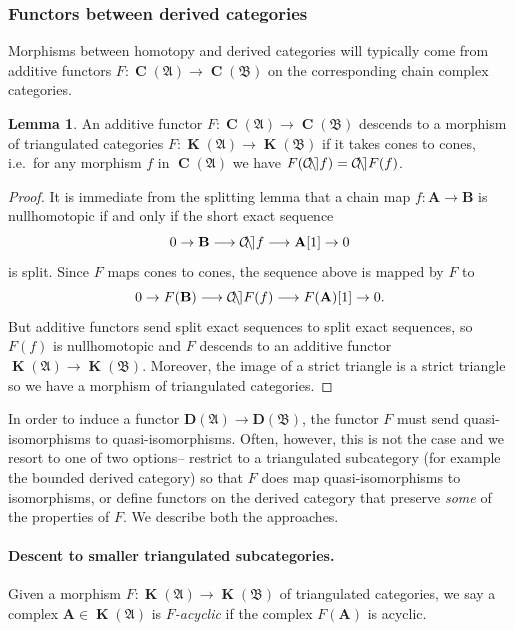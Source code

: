 \documentclass[a4paper]{article}
\theoremstyle{definition}
\newtheorem{lemma}[defn]{Lemma}
\theoremstyle{remark}
\DeclareMathOperator{\cone}{\mathcal{C\kern -2pt o \kern -2pt n \kern -2pt e
\kern -2pt}}
\DeclareMathOperator{\Ch}{\mathbf{C}}
\DeclareMathOperator{\kom}{{\mathbf{K}}}
\newcommand{\deri}{\mathbf{D}}
\begin{document}
\subsubsection{Functors between derived categories}
Morphisms between homotopy and derived categories will typically come from
additive functors \(F:\Ch(\mathfrak{A})\rightarrow \Ch(\mathfrak{B})\) on the
corresponding chain complex categories.

\begin{lemma}\label{descent-to-homotopy}
    An additive functor \(F:\Ch(\mathfrak{A})\rightarrow \Ch(\mathfrak{B})\)
    descends to a morphism of triangulated categories
    \(F:\kom(\mathfrak{A})\rightarrow \kom(\mathfrak{B})\) if
    it takes cones to cones, i.e.\ for any morphism \(f\) in
    \(\Ch(\mathfrak{A})\) we have \({F(\cone f) = \cone F(f)}\).
    \begin{proof}
        It is immediate from the splitting lemma that a chain map
        \(f:\mathbf{A}\rightarrow\mathbf{B}\) is nullhomotopic if and only if
        the short exact sequence 
        \[0\rightarrow \mathbf{B}\longrightarrow \cone f \longrightarrow
        \mathbf{A}[1] \rightarrow 0\]
        is split. Since \(F\) maps cones to cones, the sequence above is mapped
        by \(F\) to
        \[0\rightarrow F(\mathbf{B}) \longrightarrow \cone F(f)\longrightarrow
        F(\mathbf{A})[1]\rightarrow 0.\]
        But additive functors send split exact sequences to split exact
        sequences, so \(F(f)\) is nullhomotopic and \(F\) descends to an
        additive functor \(\kom(\mathfrak{A})\rightarrow \kom(\mathfrak{B})\).
        Moreover, the image of a strict triangle is a strict triangle
        so we have a morphism of triangulated categories.
    \end{proof}
\end{lemma}

In order to induce a functor \(\deri(\mathfrak{A})\rightarrow
\deri(\mathfrak{B})\), the functor \(F\) must send quasi-isomorphisms to
quasi-isomorphisms. Often, however, this is not the case and we resort to one of
two options-- restrict to a triangulated subcategory (for example the bounded
derived category) so that \(F\) does map quasi-isomorphisms to isomorphisms, or
define functors on the derived category that preserve \textit{some} of the
properties of \(F\). We describe both the approaches.

\paragraph{Descent to smaller triangulated subcategories.} 
Given a morphism \(F:\kom(\mathfrak{A})\rightarrow \kom(\mathfrak{B})\) of
triangulated categories, we say a complex \(\mathbf{A}\in \kom(\mathfrak{A})\)
is \textit{\(F\)-acyclic} if the complex \(F(\mathbf{A})\) is acyclic. 
\end{document}
